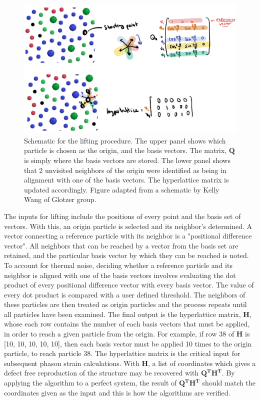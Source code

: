 \documentclass{article}
\begin{document}
\begin{figure}[htp!]
    \includegraphics[scale=0.8]{schematic.png}
    \caption{Schematic for the lifting procedure. The upper panel shows which particle is chosen as the origin, and the basis vectors. The matrix, $\mathbf{Q}$ is simply where the basis vectors are stored. The lower panel shows that 2 unvisited neighbors of the origin were identified as being in alignment with one of the basis vectors. The hyperlattice matrix is updated accordingly. Figure adapted from a schematic by Kelly Wang of Glotzer group.}
    \label{fig:schematic}
    \centering
\end{figure}

The inputs for lifting include the positions of every point and the basis set of vectors. With this, an origin particle is selected and its neighbor's determined. A vector connecting a reference particle with its neighbor is a "positional difference vector". All neighbors that can be reached by a vector from the basis set are retained, and the particular basis vector by which they can be reached is noted. To account for thermal noise, deciding whether a reference particle and its neighbor is aligned with one of the basis vectors involves evaluating the dot product of every positional difference vector with every basis vector. The value of every dot product is compared with a user defined threshold. The neighbors of these particles are then treated as origin particles and the process repeats until all particles have been examined. The final output is the hyperlattice matrix, $\mathbf{H}$, whose each row contains the number of each basis vectors that must be applied, in order to reach a given particle from the origin. For example, if row 38 of $\mathbf{H}$ is [10, 10, 10, 10, 10], then each basis vector must be applied 10 times to the origin particle, to reach particle 38. The hyperlattice matrix is the critical input for subsequent phason strain calculations. With $\mathbf{H}$, a list of coordinates which gives a defect free reproduction of the structure may be recovered with $\mathbf{Q^TH^T}$. By applying the algorithm to a perfect system, the result of $\mathbf{Q^TH^T}$ should match the coordinates given as the input and this is how the algorithms are verified. 
\end{document}
